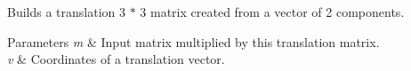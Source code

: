 Builds a translation 3 $\ast$ 3 matrix created from a vector of 2 components.


\begin{DoxyParams}{Parameters}
{\em m} & Input matrix multiplied by this translation matrix. \\
\hline
{\em v} & Coordinates of a translation vector. \\
\hline
\end{DoxyParams}
